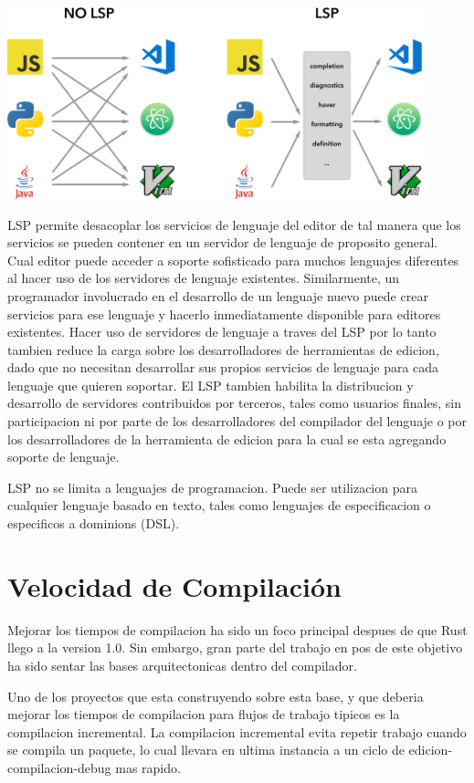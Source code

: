 \documentclass[12pt, a4paper]{report}
\begin{document}
\includegraphics[width=0.9\textwidth]{lsp}

LSP permite desacoplar los servicios de lenguaje del editor de tal manera que los servicios se pueden contener en un servidor de lenguaje de proposito general.
Cual editor puede acceder a soporte sofisticado para muchos lenguajes diferentes al hacer uso de los servidores de lenguaje existentes.
Similarmente, un programador involucrado en el desarrollo de un lenguaje nuevo puede crear servicios para ese lenguaje y hacerlo inmediatamente disponible para editores existentes.
Hacer uso de servidores de lenguaje a traves del LSP por lo tanto tambien reduce la carga sobre los desarrolladores de herramientas de edicion, dado que no necesitan desarrollar sus propios servicios de lenguaje para cada lenguaje que quieren soportar.
El LSP tambien habilita la distribucion y desarrollo de servidores contribuidos por terceros, tales como usuarios finales, sin participacion ni por parte de los desarrolladores del compilador del lenguaje o por los desarrolladores de la herramienta de edicion para la cual se esta agregando soporte de lenguaje.
\cite{language_server_protocol_wiki}

LSP no se limita a lenguajes de programacion.
Puede ser utilizacion para cualquier lenguaje basado en texto, tales como lenguajes de especificacion o especificos a dominions (DSL).
\cite{language_server_protocol_wiki}

\section*{Velocidad de Compilación}

Mejorar los tiempos de compilacion ha sido un foco principal despues de que Rust llego a la version 1.0.
Sin embargo, gran parte del trabajo en pos de este objetivo ha sido sentar las bases arquitectonicas dentro del compilador.

Uno de los proyectos que esta construyendo sobre esta base, y que deberia mejorar los tiempos de compilacion para flujos de trabajo tipicos es la compilacion incremental.
La compilacion incremental evita repetir trabajo cuando se compila un paquete, lo cual llevara en ultima instancia a un ciclo de edicion-compilacion-debug mas rapido.
\cite{rust_blog_incremental_compilation}
\end{document}
